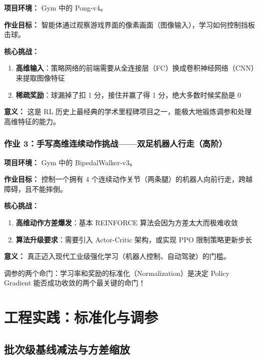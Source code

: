 \documentclass[12pt,a4paper]{article}
\theoremstyle{noteplain}
\theoremstyle{noteexercise}
\begin{document}
\textbf{项目环境：} Gym 中的 Pong-v4。

\textbf{作业目标：} 智能体通过观察游戏界面的像素画面（图像输入），学习如何控制挡板击球。

\textbf{核心挑战：}
\begin{enumerate}
  \setlength{\itemsep}{0.2em}
  \item \textbf{高维输入}：策略网络的前端需要从全连接层（FC）换成卷积神经网络（CNN）来提取图像特征
  \item \textbf{稀疏奖励}：球漏掉了扣 1 分，接住并赢了得 1 分，绝大多数时候奖励是 0
\end{enumerate}

\textbf{意义：} 这是 RL 历史上最经典的学术里程碑项目之一，能极大地锻炼调参和处理高维特征的能力。

\subsubsection{作业 3：手写高维连续动作挑战——双足机器人行走（高阶）}

\textbf{项目环境：} Gym 中的 BipedalWalker-v3。

\textbf{作业目标：} 控制一个拥有 $4$ 个连续动作关节（两条腿）的机器人向前行走，跨越障碍，且不能摔倒。

\textbf{核心挑战：}
\begin{enumerate}
  \setlength{\itemsep}{0.2em}
  \item \textbf{高维动作方差爆发}：基本 REINFORCE 算法会因为方差太大而极难收敛
  \item \textbf{算法升级要求}：需要引入 Actor-Critic 架构，或实现 PPO 限制策略更新步长
\end{enumerate}

\textbf{意义：} 真正迈入现代工业级强化学习（机器人控制、自动驾驶）的门槛。

\begin{keypoint}[实验建议]
  调参的两个命门：学习率和奖励的标准化（Normalization）是决定 Policy Gradient 能否成功收敛的两个最关键的命门！
\end{keypoint}

\section{工程实践：标准化与调参}\label{sec:practice}

\subsection{批次级基线减法与方差缩放}\label{ssec:batch-normalize}
\end{document}
